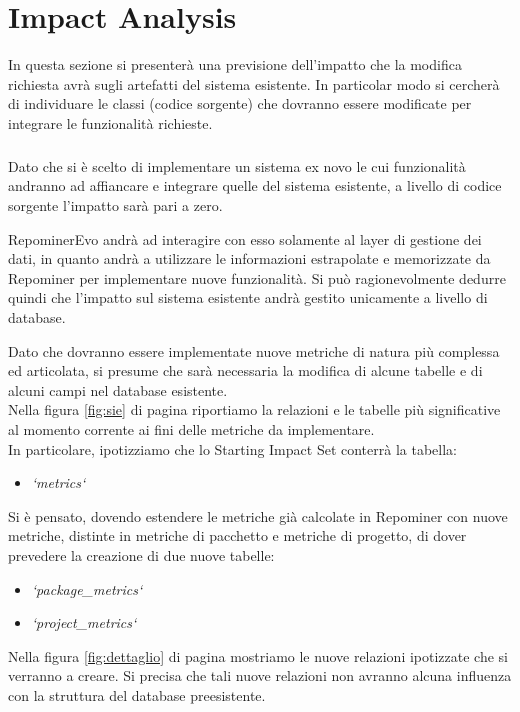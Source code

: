 \chapter{Impact Analysis}
In questa sezione si presenterà una previsione dell'impatto che la modifica richiesta avrà sugli artefatti del sistema esistente. In particolar modo si cercherà di individuare le classi (codice sorgente) che dovranno essere modificate per integrare le funzionalità richieste.

\paragraph{}
Dato che si è scelto di implementare un sistema ex novo le cui funzionalità andranno ad affiancare e integrare quelle del sistema esistente, a livello di codice sorgente l'impatto sarà pari a zero.

RepominerEvo andrà ad interagire con esso solamente al layer di gestione dei dati, in quanto andrà a utilizzare le informazioni estrapolate e memorizzate da Repominer per implementare nuove funzionalità. Si può ragionevolmente dedurre quindi che l'impatto sul sistema esistente andrà gestito unicamente a livello di database.

Dato che dovranno essere implementate nuove metriche di natura più complessa ed articolata, si presume che sarà necessaria la modifica di alcune tabelle e di alcuni campi nel database esistente.
\\

Nella figura \ref{fig:sie} di pagina \pageref{fig:sie} riportiamo la relazioni e le tabelle più significative al momento corrente ai fini delle metriche da implementare.
\\
In particolare, ipotizziamo che lo Starting Impact Set conterrà la tabella:
\begin{itemize}
\item \textit{`metrics`}
\end{itemize}
Si è pensato, dovendo estendere le metriche già calcolate in Repominer con nuove metriche, distinte in metriche di pacchetto e metriche di progetto, di dover prevedere la creazione di due nuove tabelle: 
\begin{itemize}
\item \textit{`package\_metrics`}
\item \textit{`project\_metrics`}
\end{itemize}

Nella figura \ref{fig:dettaglio} di pagina \pageref{fig:dettaglio} mostriamo le nuove relazioni ipotizzate che si verranno a creare. Si precisa che tali nuove relazioni non avranno alcuna influenza con la struttura del database preesistente.

